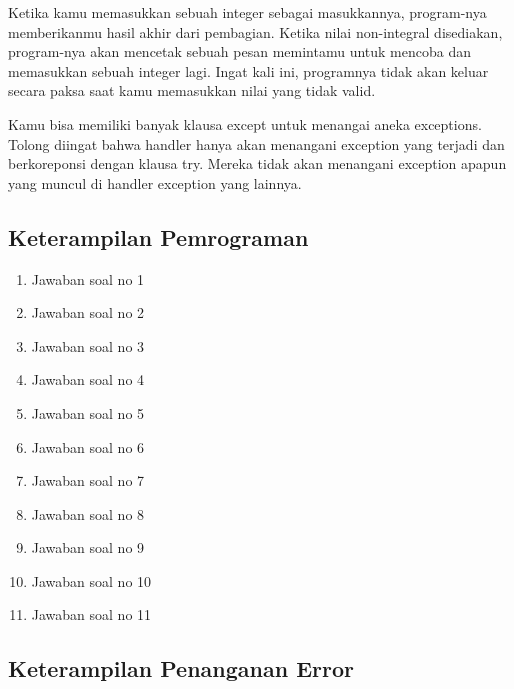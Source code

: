 Ketika kamu memasukkan sebuah integer sebagai masukkannya, program-nya memberikanmu hasil akhir dari pembagian. Ketika nilai non-integral disediakan, program-nya akan mencetak sebuah pesan memintamu untuk mencoba dan memasukkan sebuah integer lagi. Ingat kali ini, programnya tidak akan keluar secara paksa saat kamu memasukkan nilai yang tidak valid.

Kamu bisa memiliki banyak klausa except untuk menangai aneka exceptions. Tolong diingat bahwa handler hanya akan menangani exception yang terjadi dan berkoreponsi dengan klausa try. Mereka tidak akan menangani exception apapun yang muncul di handler exception yang lainnya.

\subsection{Keterampilan Pemrograman}
\begin{enumerate}
	\item Jawaban soal no 1
    
    \item Jawaban soal no 2
    
    \item Jawaban soal no 3
    
    \item Jawaban soal no 4
    
    \item Jawaban soal no 5
    
    \item Jawaban soal no 6
    
    \item Jawaban soal no 7
    
    \item Jawaban soal no 8
    
    \item Jawaban soal no 9
    
    \item Jawaban soal no 10
    
    \item Jawaban soal no 11
    
\end{enumerate}

\subsection{Keterampilan Penanganan Error}


